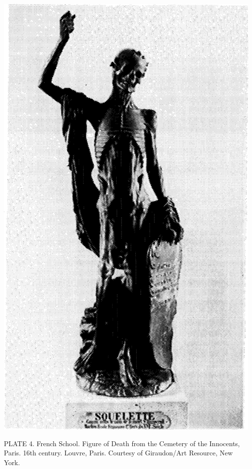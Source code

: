 \protect\hypertarget{20_ILLUSTRATIONS_FOLLOW_PAGE.xhtmlux5cux23id_2297}{}{}\includegraphics{include/html/images/324_2.png}

PLATE 4. French School. Figure of Death from the Cemetery of the
Innocents, Paris. 16th century. Louvre, Paris. Courtesy of Giraudon/Art
Resource, New York.

